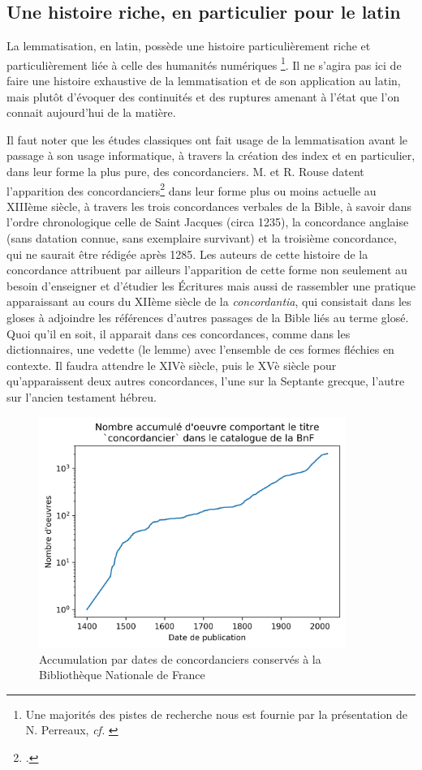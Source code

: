 \subsection{Une histoire riche, en particulier pour le latin}

La lemmatisation, en latin, possède une histoire particulièrement riche et particulièrement liée à celle des humanités numériques \footnote{Une majorités des pistes de recherche nous est fournie par la présentation de N. Perreaux, \textit{cf.} \cite{perreaux_lemmatisation_2019}}. Il ne s'agira pas ici de faire une histoire exhaustive de la lemmatisation et de son application au latin, mais plutôt d'évoquer des continuités et des ruptures amenant à l'état que l'on connait aujourd'hui de la matière.

Il faut noter que les études classiques ont fait usage de la lemmatisation avant le passage à son usage informatique, à travers la création des index et en particulier, dans leur forme la plus pure, des concordanciers. M. et R. Rouse datent l'apparition des concordanciers\footcite{rouse_concordance_1984} dans leur forme plus ou moins actuelle au XIIIème siècle, à travers les trois concordances verbales de la Bible, à savoir dans l'ordre chronologique celle de Saint Jacques (circa 1235), la concordance anglaise (sans datation connue, sans exemplaire survivant) et la troisième concordance, qui ne saurait être rédigée après 1285. Les auteurs de cette histoire de la concordance attribuent par ailleurs l'apparition de cette forme non seulement au besoin d'enseigner et d'étudier les Écritures mais aussi de rassembler une pratique apparaissant au cours du XIIème siècle de la \textit{concordantia}, qui consistait dans les gloses à adjoindre les références d'autres passages de la Bible liés au terme glosé. Quoi qu'il en soit, il apparait dans ces concordances, comme dans les dictionnaires, une vedette (le lemme) avec l'ensemble de ces formes fléchies en contexte. Il faudra attendre le XIVè siècle, puis le XVè siècle pour qu'apparaissent deux autres concordances, l'une sur la Septante grecque, l'autre sur l'ancien testament hébreu.

\begin{figure}[h]
    \centering
    \includegraphics[width=10cm]{results/lemmatisation/histoire/concordanciers.png}
    \caption{Accumulation par dates de concordanciers conservés à la Bibliothèque Nationale de France}
    \label{lemmatisation:concordanciers}
\end{figure}

